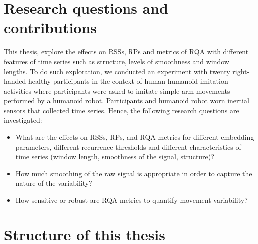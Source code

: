 %









\section{Research questions and contributions}
This thesis, explore the effects on RSSs, RPs and metrics of RQA
with different features of time series such as structure, 
levels of smoothness and window lengths.
To do such exploration, we conducted an experiment with twenty 
right-handed healthy participants in the context of 
human-humanoid imitation activities where participants 
were asked to imitate simple arm movements performed 
by a humanoid robot. Participants and humanoid robot worn 
inertial sensors that collected time series.
Hence, the following research questions are investigated:


\begin{itemize}

\item What are the effects on RSSs, RPs, and RQA metrics
	for different embedding parameters, different recurrence thresholds 
	and different characteristics of time series (window length, smoothness of the signal, structure)?

\item How much smoothing of the raw signal is appropriate in order to capture the
	nature of the variability?

\item How sensitive or robust are RQA metrics to quantify movement variability?

\end{itemize}






\section{Structure of this thesis}

